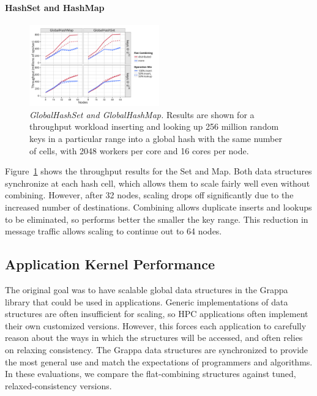 \paragraph{HashSet and HashMap}
\begin{figure}[t]
  \centering
  \includegraphics[width=0.5\textwidth]{data/plots/hash_perf.pdf}
  \caption{\emph{GlobalHashSet and GlobalHashMap.}
    Results are shown for a throughput workload inserting and looking up 256 million random keys in a particular range into a global hash with the same number of cells, with 2048 workers per core and 16 cores per node.
  }
  \label{fig:hash_perf}
\end{figure}

Figure~\ref{fig:hash_perf} shows the throughput results for the Set and Map.
Both data structures synchronize at each hash cell, which allows them to scale fairly well even without combining. However, after 32 nodes, scaling drops off significantly due to the increased number of destinations.
Combining allows duplicate inserts and lookups to be eliminated, so performs better the smaller the key range. This reduction in message traffic allows scaling to continue out to 64 nodes.

\subsection{Application Kernel Performance}
The original goal was to have scalable global data structures in the Grappa library that could be used in applications. Generic implementations of data structures are often insufficient for scaling, so HPC applications often implement their own customized versions. However, this forces each application to carefully reason about the ways in which the structures will be accessed, and often relies on relaxing consistency.
The Grappa data structures are synchronized to provide the most general use and match the expectations of programmers and algorithms.
In these evaluations, we compare the flat-combining structures against tuned, relaxed-consistency versions.

